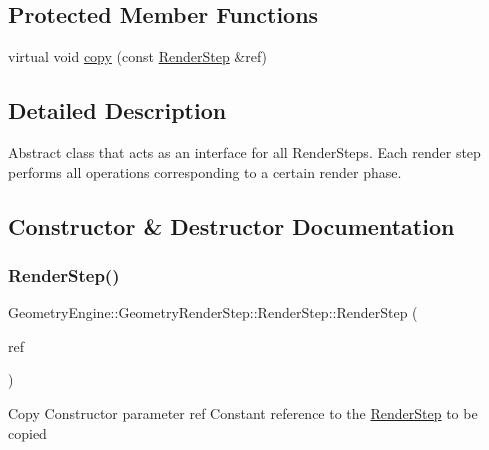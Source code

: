 \subsection*{Protected Member Functions}
\begin{DoxyCompactItemize}
\item 
virtual void \mbox{\hyperlink{class_geometry_engine_1_1_geometry_render_step_1_1_render_step_afe0321446beeb4093dba701424ec1e8c}{copy}} (const \mbox{\hyperlink{class_geometry_engine_1_1_geometry_render_step_1_1_render_step}{Render\+Step}} \&ref)
\end{DoxyCompactItemize}


\subsection{Detailed Description}
Abstract class that acts as an interface for all Render\+Steps. Each render step performs all operations corresponding to a certain render phase. 

\subsection{Constructor \& Destructor Documentation}
\mbox{\label{class_geometry_engine_1_1_geometry_render_step_1_1_render_step_a0a1c36303ca0342f1bf9afcecb35e513}} 
\subsubsection{\texorpdfstring{RenderStep()}{RenderStep()}}
{\footnotesize\ttfamily Geometry\+Engine\+::\+Geometry\+Render\+Step\+::\+Render\+Step\+::\+Render\+Step (\begin{DoxyParamCaption}\item[{const \mbox{\hyperlink{class_geometry_engine_1_1_geometry_render_step_1_1_render_step}{Render\+Step}} \&}]{ref }\end{DoxyParamCaption})\hspace{0.3cm}{\ttfamily [inline]}}

Copy Constructor parameter ref Constant reference to the \mbox{\hyperlink{class_geometry_engine_1_1_geometry_render_step_1_1_render_step}{Render\+Step}} to be copied 

